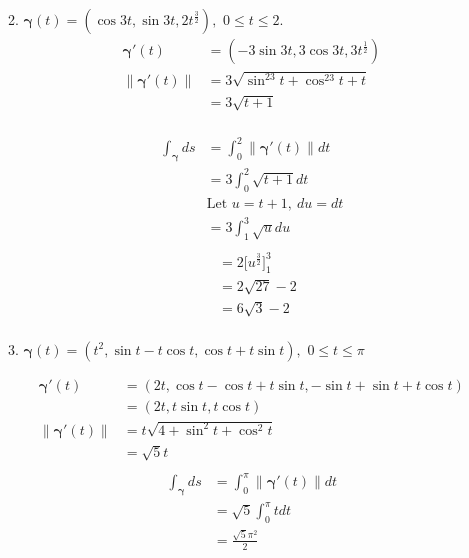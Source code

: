 \documentclass{article}
\newcommand{\norm}[1]{\| #1 \|}
\begin{document}
\begin{enumerate}
\begin{enumerate}
\begin{multicols}{2}
    \end{multicols}
    \item $\displaystyle \boldsymbol{\gamma}(t) = (\cos 3t ,\sin 3t ,2t^{\frac{3}{2}}),$ $0 \leq t \leq 2$.
    \begin{align*} 
        \boldsymbol{\gamma}'(t) &= (-3\sin3t,3\cos3t,3t^\frac{1}{2}) \\
        \norm{\boldsymbol{\gamma}'(t)} &= 3\sqrt{\sin^23t+\cos^23t+t} \\
        &= 3\sqrt{t + 1} \\
    \end{align*}
    \begin{multicols}{2} 
    \noindent
    \begin{align*}
        \int_{\boldsymbol{\gamma}} ds &= \int_0^2 \norm{\boldsymbol{\gamma}'(t)} dt \\
        &= 3\int_0^2 \sqrt{t+1} dt \\
        &\text{Let } u = t + 1,\: du = dt \\
        &= 3\int_1^3 \sqrt{u} du \\
    \end{align*}
    \begin{align*}
        &= 2\Big[u^\frac{3}{2}\Big]_1^3 \\
        &= 2\sqrt{27} - 2 \\
        &= 6\sqrt{3} - 2 \\
    \end{align*}
    \end{multicols}
    \item $\displaystyle \boldsymbol{\gamma}(t) = (t^2, \sin t - t\cos t, \cos t + t\sin t),$ $0 \leq t \leq \pi$
    \begin{multicols}{2} 
    \noindent
    \begin{align*} 
        \boldsymbol{\gamma}'(t) &= (2t,\cos t-\cos t+t\sin t, -\sin t+\sin t+t\cos t) \\
        &= (2t,t\sin t,t\cos t) \\
        \norm{\boldsymbol{\gamma}'(t)} &= t\sqrt{4 + \sin^2t+\cos^2t} \\
        &= \sqrt{5}t \\
    \end{align*}
    \begin{align*}
        \int_{\boldsymbol{\gamma}} ds &= \int_0^\pi \norm{\boldsymbol{\gamma}'(t)} dt \\
        &= \sqrt{5}\int_0^\pi t dt \\
        &= \frac{\sqrt{5}\pi^2}{2}

\end{align*}
\end{multicols}
\end{enumerate}
\end{enumerate}
\end{document}
